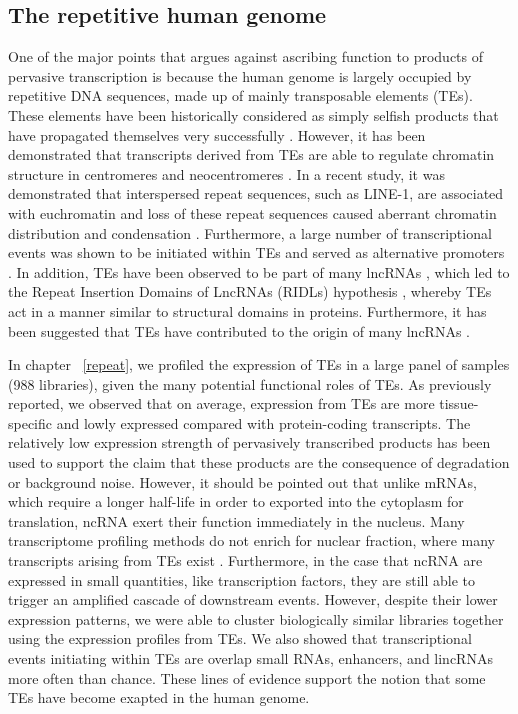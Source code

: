 \subsection{The repetitive human genome}

One of the major points that argues against ascribing function to products of pervasive transcription is because the human genome is largely occupied by repetitive DNA sequences, made up of mainly transposable elements (TEs). These elements have been historically considered as simply selfish products that have propagated themselves very successfully \citep{doolittle1980selfish,orgel1980selfish}. However, it has been demonstrated that transcripts derived from TEs are able to regulate chromatin structure in centromeres and neocentromeres \citep{pmid19180186}. In a recent study, it was demonstrated that interspersed repeat sequences, such as LINE-1, are associated with euchromatin and loss of these repeat sequences caused aberrant chromatin distribution and condensation \citep{pmid24581492}. Furthermore, a large number of transcriptional events was shown to be initiated within TEs and served as alternative promoters \citep{pmid19377475}. In addition, TEs have been observed to be part of many lncRNAs \citep{pmid23181609}, which led to the Repeat Insertion Domains of LncRNAs (RIDLs) hypothesis \citep{pmid24850885}, whereby TEs act in a manner similar to structural domains in proteins. Furthermore, it has been suggested that TEs have contributed to the origin of many lncRNAs \citep{pmid23637635,pmid25218058}.

In chapter ~\ref{repeat}, we profiled the expression of TEs in a large panel of samples (988 libraries), given the many potential functional roles of TEs. As previously reported, we observed that on average, expression from TEs are more tissue-specific and lowly expressed compared with protein-coding transcripts. The relatively low expression strength of pervasively transcribed products has been used to support the claim that these products are the consequence of degradation or background noise. However, it should be pointed out that unlike mRNAs, which require a longer half-life in order to exported into the cytoplasm for translation, ncRNA exert their function immediately in the nucleus. Many transcriptome profiling methods do not enrich for nuclear fraction, where many transcripts arising from TEs exist \citep{pmid24777452}. Furthermore, in the case that ncRNA are expressed in small quantities, like transcription factors, they are still able to trigger an amplified cascade of downstream events. However, despite their lower expression patterns, we were able to cluster biologically similar libraries together using the expression profiles from TEs. We also showed that transcriptional events initiating within TEs are overlap small RNAs, enhancers, and lincRNAs more often than chance. These lines of evidence support the notion that some TEs have become exapted in the human genome.

